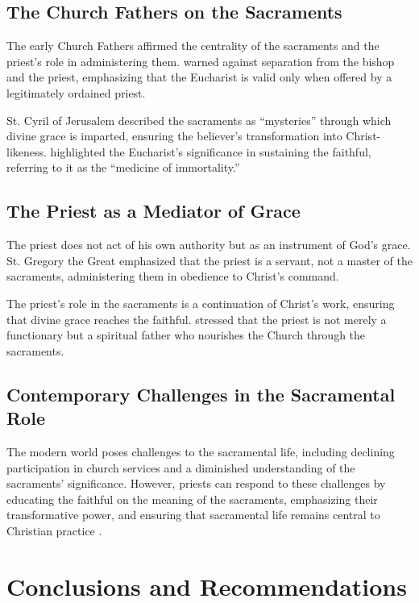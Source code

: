 \documentclass[12pt,doc]{apa7}   	%
\begin{document}
\subsection{The Church Fathers on the Sacraments}

The early Church Fathers affirmed the centrality of the sacraments and the priest’s role in administering them. \cite{epistles_ignatius} warned against separation from the bishop and the priest, emphasizing that the Eucharist is valid only when offered by a legitimately ordained priest. 

St. Cyril of Jerusalem \citep{early_church_akin} described the sacraments as ``mysteries'' through which divine grace is imparted, ensuring the believer’s transformation into Christ-likeness. \citet{priesthood_chrysostom,complete_work_chrysostom} highlighted the Eucharist’s significance in sustaining the faithful, referring to it as the ``medicine of immortality.''

\subsection{The Priest as a Mediator of Grace}

The priest does not act of his own authority but as an instrument of God’s grace. St. Gregory the Great \citep{early_church_akin} emphasized that the priest is a servant, not a master of the sacraments, administering them in obedience to Christ’s command.

The priest’s role in the sacraments is a continuation of Christ’s work, ensuring that divine grace reaches the faithful. \citet{priesthood_shenouda} stressed that the priest is not merely a functionary but a spiritual father who nourishes the Church through the sacraments.

\subsection{Contemporary Challenges in the Sacramental Role}

The modern world poses challenges to the sacramental life, including declining participation in church services and a diminished understanding of the sacraments’ significance. However, priests can respond to these challenges by educating the faithful on the meaning of the sacraments, emphasizing their transformative power, and ensuring that sacramental life remains central to Christian practice \citep{eucharist_schmemann}.

\section{Conclusions and Recommendations}
\end{document}
